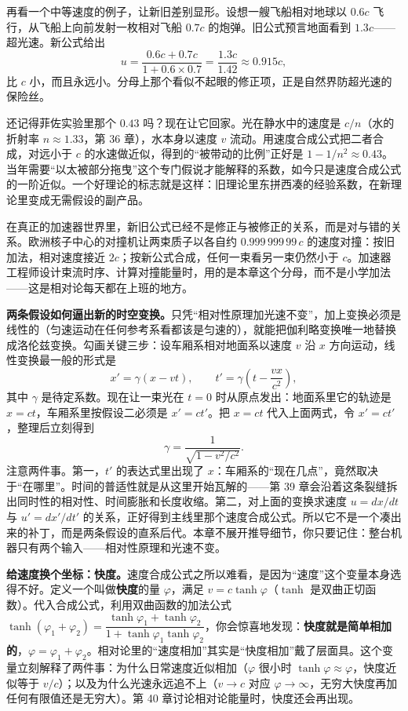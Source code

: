 再看一个中等速度的例子，让新旧差别显形。设想一艘飞船相对地球以 \(0.6c\) 飞行，从飞船上向前发射一枚相对飞船 \(0.7c\) 的炮弹。旧公式预言地面看到 \(1.3c\)——超光速。新公式给出
\[
u=\frac{0.6c+0.7c}{1+0.6\times0.7}=\frac{1.3c}{1.42}\approx0.915c,
\]
比 \(c\) 小，而且永远小。分母上那个看似不起眼的修正项，正是自然界防超光速的保险丝。

还记得菲佐实验里那个 \(0.43\) 吗？现在让它回家。光在静水中的速度是 \(c/n\)（水的折射率 \(n\approx1.33\)，第 36 章），水本身以速度 \(v\) 流动。用速度合成公式把二者合成，对远小于 \(c\) 的水速做近似，得到的“被带动的比例”正好是 \(1-1/n^{2}\approx0.43\)。当年需要“以太被部分拖曳”这个专门假说才能解释的系数，如今只是速度合成公式的一阶近似。一个好理论的标志就是这样：旧理论里东拼西凑的经验系数，在新理论里变成无需假设的副产品。

在真正的加速器世界里，新旧公式已经不是修正与被修正的关系，而是对与错的关系。欧洲核子中心的对撞机让两束质子以各自约 \(0.999\,999\,99\,c\) 的速度对撞：按旧加法，相对速度接近 \(2c\)；按新公式合成，任何一束看另一束仍然小于 \(c\)。加速器工程师设计束流时序、计算对撞能量时，用的是本章这个分母，而不是小学加法——这是相对论每天都在上班的地方。

\begin{mathbridge}
\textbf{两条假设如何逼出新的时空变换。}只凭“相对性原理加光速不变”，加上变换必须是线性的（匀速运动在任何参考系看都该是匀速的），就能把伽利略变换唯一地替换成洛伦兹变换。勾画关键三步：设车厢系相对地面系以速度 \(v\) 沿 \(x\) 方向运动，线性变换最一般的形式是
\[
x'=\gamma(x-vt),\qquad t'=\gamma\!\left(t-\frac{vx}{c^{2}}\right),
\]
其中 \(\gamma\) 是待定系数。现在让一束光在 \(t=0\) 时从原点发出：地面系里它的轨迹是 \(x=ct\)，车厢系里按假设二必须是 \(x'=ct'\)。把 \(x=ct\) 代入上面两式，令 \(x'=ct'\)，整理后立刻得到
\[
\gamma=\frac{1}{\sqrt{1-v^{2}/c^{2}}}.
\]
注意两件事。第一，\(t'\) 的表达式里出现了 \(x\)：车厢系的“现在几点”，竟然取决于“在哪里”。时间的普适性就是从这里开始瓦解的——第 39 章会沿着这条裂缝拆出同时性的相对性、时间膨胀和长度收缩。第二，对上面的变换求速度 \(u=dx/dt\) 与 \(u'=dx'/dt'\) 的关系，正好得到主线里那个速度合成公式。所以它不是一个凑出来的补丁，而是两条假设的直系后代。本章不展开推导细节，你只要记住：整台机器只有两个输入——相对性原理和光速不变。
\end{mathbridge}

\begin{challenge}
\textbf{给速度换个坐标：快度。}速度合成公式之所以难看，是因为“速度”这个变量本身选得不好。定义一个叫做\textbf{快度}的量 \(\varphi\)，满足 \(v=c\tanh\varphi\)（\(\tanh\) 是双曲正切函数）。代入合成公式，利用双曲函数的加法公式 \(\tanh(\varphi_1+\varphi_2)=\dfrac{\tanh\varphi_1+\tanh\varphi_2}{1+\tanh\varphi_1\tanh\varphi_2}\)，你会惊喜地发现：\textbf{快度就是简单相加的}，\(\varphi=\varphi_1+\varphi_2\)。相对论里的“速度相加”其实是“快度相加”戴了层面具。这个变量立刻解释了两件事：为什么日常速度近似相加（\(\varphi\) 很小时 \(\tanh\varphi\approx\varphi\)，快度近似等于 \(v/c\)）；以及为什么光速永远追不上（\(v\to c\) 对应 \(\varphi\to\infty\)，无穷大快度再加任何有限值还是无穷大）。第 40 章讨论相对论能量时，快度还会再出现。
\end{challenge}

